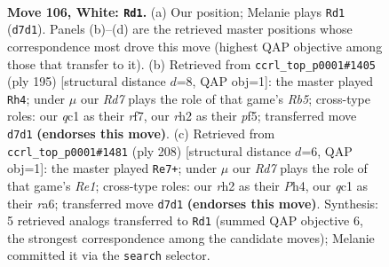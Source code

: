 \documentclass[11pt]{article}
\begin{document}
\clearpage

\begin{figure}[p]\centering
\begin{subfigure}{0.46\textwidth}\centering
\resizebox{\linewidth}{!}{%
\newchessgame
\chessboard[
  setfen={1k6/3R4/8/8/p7/8/7r/2q2K2 w - - 6 106},
  showmover=false,
  pgfstyle=straightmove, color=movearrow, markmove={d7-d1}
]}
\caption{}
\end{subfigure}\hfill
\begin{subfigure}{0.46\textwidth}\centering
\resizebox{\linewidth}{!}{%
\newchessgame
\chessboard[
  setfen={8/5R2/5p1k/5P2/1r6/5K2/8/8 b - - 9 98},
  showmover=false,
  pgfstyle=straightmove, color=movearrow, markmove={b4-h4}
]}
\caption{}
\end{subfigure}
\\[4pt]
\begin{subfigure}{0.46\textwidth}\centering
\resizebox{\linewidth}{!}{%
\newchessgame
\chessboard[
  setfen={5K2/3k4/r7/8/7P/6p1/8/4R3 w - - 16 105},
  showmover=false,
  pgfstyle=straightmove, color=movearrow, markmove={e1-e7}
]}
\caption{}
\end{subfigure}\hfill

\caption{\textbf{Move 106, White: \texttt{Rd1}.} (a) Our position; Melanie plays \texttt{Rd1} (\texttt{d7d1}). Panels (b)--(d) are the retrieved master positions whose correspondence most drove this move (highest QAP objective among those that transfer to it). (b) Retrieved from \texttt{ccrl\_top\_p0001\#1405} (ply 195) [structural distance $d$=8, QAP obj=1]: the master played \texttt{Rh4}; under $\mu$ our \emph{Rd7} plays the role of that game's \emph{Rb5}; cross-type roles: our \emph{q}c1 as their \emph{r}f7, our \emph{r}h2 as their \emph{p}f5; transferred move \texttt{d7d1} \textbf{(endorses this move)}. (c) Retrieved from \texttt{ccrl\_top\_p0001\#1481} (ply 208) [structural distance $d$=6, QAP obj=1]: the master played \texttt{Re7+}; under $\mu$ our \emph{Rd7} plays the role of that game's \emph{Re1}; cross-type roles: our \emph{r}h2 as their \emph{P}h4, our \emph{q}c1 as their \emph{r}a6; transferred move \texttt{d7d1} \textbf{(endorses this move)}. Synthesis: 5 retrieved analogs transferred to \texttt{Rd1} (summed QAP objective 6, the strongest correspondence among the candidate moves); Melanie committed it via the \texttt{search} selector.}
\label{fig:thought-m210}
\end{figure}
\end{document}
